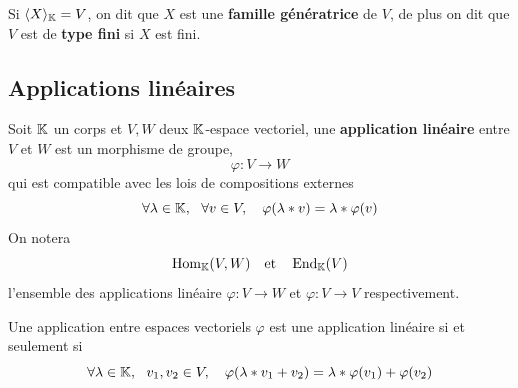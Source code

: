 

\begin{definition} \label{def: famille génératrice}
	Si $\langle X \rangle_{\mathbb{K}} = V$, on dit que $X$ est une \textbf{famille génératrice} de $V$, de plus on dit que $V$ est de \textbf{type fini} si $X$ est fini.
\end{definition}

\subsection{Applications linéaires}
\begin{definition} \label{def: application linéaire}
	Soit $\mathbb{K}$ un corps et $V, W$ deux $\mathbb{K}$-espace vectoriel, une \textbf{application linéaire} entre $V$ et $W$ est un morphisme de groupe,
	\[
	\varphi : V \to W
	\]
	qui est compatible avec les lois de compositions externes
	\[
	\forall \lambda \in \mathbb{K}, ~\ \forall v \in V, \quad \varphi(\lambda * v) = \lambda * \varphi(v)
	\]
	On notera
	\[
	\operatorname{Hom}_{\mathbb{K}}(V,W) \quad \text{et} \quad \operatorname{End}_{\mathbb{K}}(V)
	\]
	l'ensemble des applications linéaire $\varphi : V \to W$ et $\varphi : V \to V$ respectivement.
\end{definition}

\begin{prop} \label{prop: Critère d'application linéaire}
	Une application entre espaces vectoriels $\varphi$ est une application linéaire si et seulement si 
	\begin{equation}\label{eq: Critère d'application linéaire}
	\forall \lambda \in \mathbb{K}, ~\ v_1, v_2 \in V, \quad \varphi(\lambda * v_1 + v_2) = \lambda * \varphi (v_1) + \varphi(v_2)
	\end{equation}	
\end{prop}

